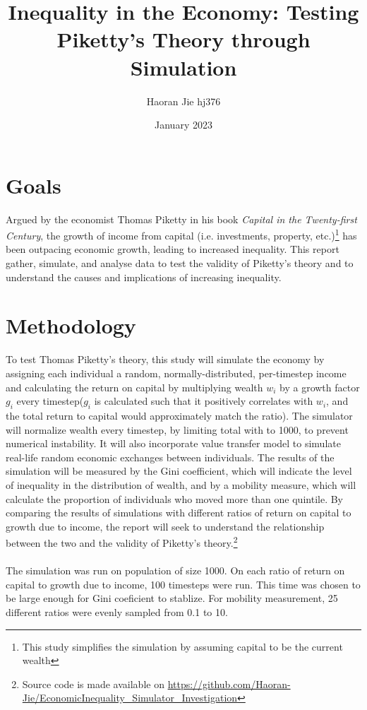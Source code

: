 \documentclass{article}
\title{Inequality in the Economy: Testing Piketty's Theory through Simulation
}
\author{Haoran Jie hj376}
\date{January 2023}
\begin{document}
\maketitle


\section*{Goals}
\vspace{-0.3cm}
Argued by the economist Thomas Piketty in his book \textit{Capital in the Twenty-first Century}, the growth of income from capital (i.e. investments, property, etc.)\footnote{This study simplifies the simulation by assuming capital to be the current wealth} has been outpacing economic growth, leading to increased inequality. This report gather, simulate, and analyse data to test the validity of Piketty's theory and to understand the causes and implications of increasing inequality.
\vspace{-0.4cm}
\section*{Methodology}
\vspace{-0.3cm}
To test Thomas Piketty's theory, this study will simulate the economy by 
assigning each individual a random, normally-distributed, per-timestep income and calculating the return on capital by multiplying wealth $w_i$ by a growth 
factor $g_i$ every timestep($g_i$ is calculated such that it positively correlates with $w_i$, and the total return to capital would approximately match the ratio). 
The simulator will normalize wealth every timestep, by limiting total with to 1000, to prevent numerical instability. It will also incorporate value transfer model to simulate real-life random economic exchanges between individuals. The results of the 
simulation will be measured by the Gini coefficient, which will indicate the level of inequality in the distribution of wealth,
 and by a mobility measure, which will calculate the proportion of individuals who moved more than one quintile. By comparing 
 the results of simulations with different ratios of return on capital to growth due to income, the report will seek to 
 understand the relationship between the two and the validity of Piketty's theory.\footnote{Source code is made available on  \url{https://github.com/Haoran-Jie/EconomicInequality_Simulator_Investigation}}
\\\\
The simulation was run on population of size 1000. On each ratio of return on capital to growth due to income, 100 timesteps were run. This time was chosen to be large enough for Gini coeficient to stablize. For mobility measurement, 25 different ratios were evenly sampled from 0.1 to 10.
\end{document}
